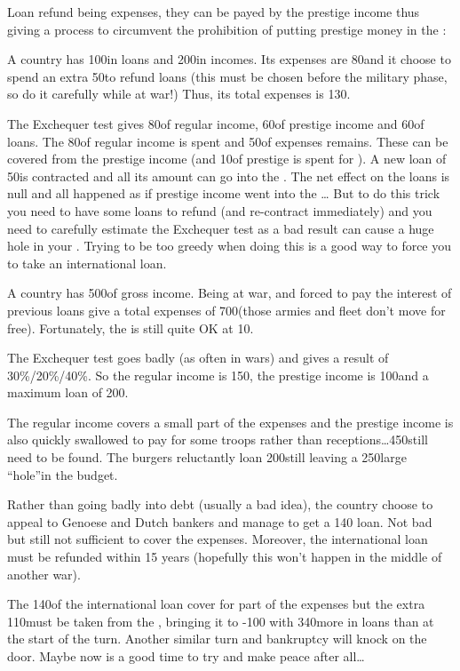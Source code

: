 \begin{exemple}
  Loan refund being expenses, they can be payed by the prestige income thus
  giving a process to circumvent the prohibition of putting prestige money in
  the \RT:\par
  A country has 100\Ducats in loans and 200\Ducats in incomes. Its expenses
  are 80\Ducats and it choose to spend an extra 50\Ducats to refund loans
  (this must be chosen before the military phase, so do it carefully while at
  war!) Thus, its total expenses is 130\Ducats.

  The Exchequer test gives 80\Ducats of regular income, 60\Ducats of prestige
  income and 60\Ducats of loans. The 80\Ducats of regular income is spent and
  50\Ducats of expenses remains. These can be covered from the prestige income
  (and 10\Ducats of prestige is spent for \VPs). A new loan of 50\Ducats is
  contracted and all its amount can go into the \RT. The net effect on the
  loans is null and all happened as if prestige income went into the \RT\ldots
  But to do this trick you need to have some loans to refund (and re-contract
  immediately) and you need to carefully estimate the Exchequer test as a bad
  result can cause a huge hole in your \RT. Trying to be too greedy when doing
  this is a good way to force you to take an international loan.
\end{exemple}

\begin{exemple}
  A country has 500\Ducats of gross income. Being at war, and forced to pay
  the interest of previous loans give a total expenses of 700\Ducats (those
  armies and fleet don't move for free). Fortunately, the \RT is still quite
  OK at 10\Ducats.

  The Exchequer test goes badly (as often in wars) and gives a result of
  30\%/20\%/40\%. So the regular income is 150\Ducats, the prestige income is
  100\Ducats and a maximum loan of 200\Ducats.

  The regular income covers a small part of the expenses and the prestige
  income is also quickly swallowed to pay for some troops rather than
  receptions\ldots 450\Ducats still need to be found. The burgers reluctantly
  loan 200\Ducats still leaving a 250\Ducats large ``hole''in the budget.

  Rather than going badly into debt (usually a bad idea), the country choose
  to appeal to Genoese and Dutch bankers and manage to get a 140\Ducats
  loan. Not bad but still not sufficient to cover the expenses. Moreover, the
  international loan must be refunded within 15 years (hopefully this won't
  happen in the middle of another war).

  The 140\Ducats of the international loan cover for part of the expenses but
  the extra 110\Ducats must be taken from the \RT, bringing it to -100\Ducats
  with 340\Ducats more in loans than at the start of the turn. Another similar
  turn and bankruptcy will knock on the door. Maybe now is a good time to try
  and make peace after all\ldots
\end{exemple}




